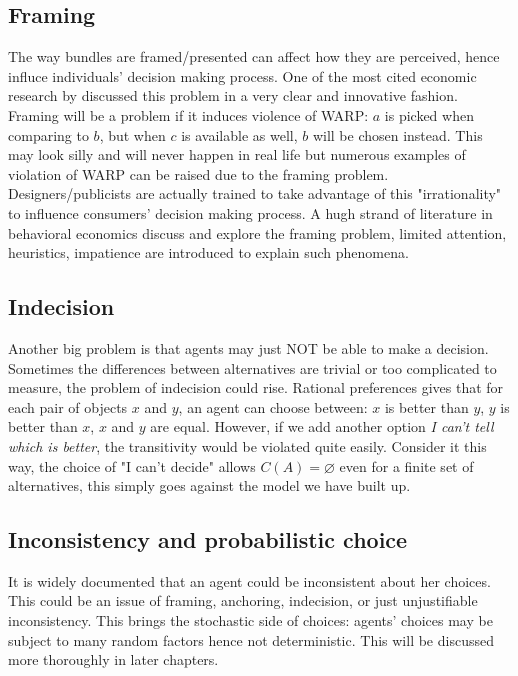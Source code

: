 \subsection*{Framing}
The way bundles are framed/presented can affect how they are perceived, hence influce individuals' decision making process. One of the most cited economic research by \citet{kai1979prospect} discussed this problem in a very clear and
innovative fashion. Framing will be a problem if it induces violence of WARP: $a$ is picked when comparing to $b$, but when $c$ is available as well, $b$ will be chosen instead. This may look silly and will never happen in real life but 
numerous examples of violation of WARP can be raised due to the framing problem. Designers/publicists are actually trained to take advantage of this "irrationality" to influence consumers' decision making process. A hugh strand of literature
in behavioral economics discuss and explore the framing problem, limited attention, heuristics, impatience are introduced to explain such phenomena. 

\subsection*{Indecision}
Another big problem is that agents may just NOT be able to make a decision. Sometimes the differences between alternatives are trivial or too complicated to measure, the problem of indecision could rise. Rational preferences gives that for each pair of objects $x$ and $y$, an agent can 
choose between: $x$ is better than $y$, $y$ is better than $x$, $x$ and $y$ are equal. However, if we add another option \textit{I can't tell which is better}, the transitivity would be violated quite easily. Consider it this way, the choice of "I can't decide" allows $C(A)=\varnothing$ even
for a finite set of alternatives, this simply goes against the model we have built up.

\subsection*{Inconsistency and probabilistic choice}
It is widely documented that an agent could be inconsistent about her choices. This could be an issue of framing, anchoring, indecision, or just unjustifiable inconsistency. This brings the stochastic side of choices: agents' choices may be subject to many random factors
hence not deterministic. This will be discussed more thoroughly in later chapters.

